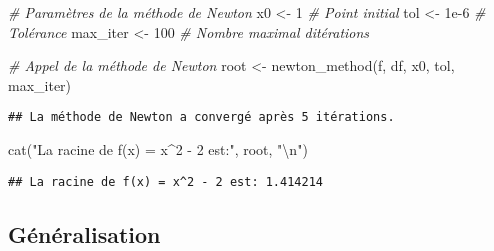 \documentclass[
]{article}
\newenvironment{Shaded}{\begin{snugshade}}{\end{snugshade}}
\newcommand{\CommentTok}[1]{\textcolor[rgb]{0.56,0.35,0.01}{\textit{#1}}}
\newcommand{\DecValTok}[1]{\textcolor[rgb]{0.00,0.00,0.81}{#1}}
\newcommand{\FloatTok}[1]{\textcolor[rgb]{0.00,0.00,0.81}{#1}}
\newcommand{\FunctionTok}[1]{\textcolor[rgb]{0.00,0.00,0.00}{#1}}
\newcommand{\NormalTok}[1]{#1}
\newcommand{\OtherTok}[1]{\textcolor[rgb]{0.56,0.35,0.01}{#1}}
\newcommand{\SpecialCharTok}[1]{\textcolor[rgb]{0.00,0.00,0.00}{#1}}
\newcommand{\StringTok}[1]{\textcolor[rgb]{0.31,0.60,0.02}{#1}}
\begin{document}
\begin{Shaded}
\begin{Highlighting}[]
\CommentTok{\# Paramètres de la méthode de Newton}
\NormalTok{x0 }\OtherTok{\textless{}{-}} \DecValTok{1}  \CommentTok{\# Point initial}
\NormalTok{tol }\OtherTok{\textless{}{-}} \FloatTok{1e{-}6}  \CommentTok{\# Tolérance}
\NormalTok{max\_iter }\OtherTok{\textless{}{-}} \DecValTok{100}  \CommentTok{\# Nombre maximal d\textquotesingle{}itérations}

\CommentTok{\# Appel de la méthode de Newton}
\NormalTok{root }\OtherTok{\textless{}{-}} \FunctionTok{newton\_method}\NormalTok{(f, df, x0, tol, max\_iter)}
\end{Highlighting}
\end{Shaded}

\begin{verbatim}
## La méthode de Newton a convergé après 5 itérations.
\end{verbatim}

\begin{Shaded}
\begin{Highlighting}[]
\FunctionTok{cat}\NormalTok{(}\StringTok{"La racine de f(x) = x\^{}2 {-} 2 est:"}\NormalTok{, root, }\StringTok{"}\SpecialCharTok{\textbackslash{}n}\StringTok{"}\NormalTok{)}
\end{Highlighting}
\end{Shaded}

\begin{verbatim}
## La racine de f(x) = x^2 - 2 est: 1.414214
\end{verbatim}

\hypertarget{guxe9nuxe9ralisation}{%
\subsection{Généralisation}\label{guxe9nuxe9ralisation}}
\end{document}
